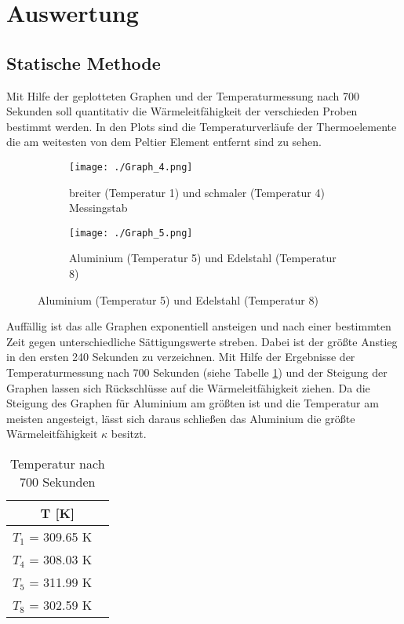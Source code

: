 \section{Auswertung}
\label{sec:Auswertung}
\subsection{Statische Methode}

Mit Hilfe der geplotteten Graphen und der Temperaturmessung nach 700 Sekunden soll quantitativ die Wärmeleitfähigkeit der verschieden Proben bestimmt werden. In den Plots sind die Temperaturverläufe der Thermoelemente die am weitesten von dem Peltier Element entfernt sind zu sehen.
\begin{figure}
	\caption{Temperaturverlauf}
	\centering
	\begin{subfigure}{0.48\textwidth}
		\centering
  		\texttt{[image: ./Graph\_4.png]}
  		\caption{breiter (Temperatur 1) und schmaler (Temperatur 4) Messingstab}
		\label{fig:T1T4}
	\end{subfigure}
	\begin{subfigure}{0.48\textwidth}
  		\centering
  		\texttt{[image: ./Graph\_5.png]}
  		\caption{Aluminium (Temperatur 5) und Edelstahl (Temperatur 8)}
		\label{fig:T5T8}
	\end{subfigure}
\end{figure}
Auffällig ist das alle Graphen exponentiell ansteigen und nach einer bestimmten Zeit gegen unterschiedliche Sättigungswerte streben. Dabei ist der größte Anstieg in den ersten 240 Sekunden zu verzeichnen. Mit Hilfe der Ergebnisse der Temperaturmessung nach 700 Sekunden (siehe Tabelle \ref{tab:kelv}) und der Steigung der Graphen lassen sich Rückschlüsse auf die Wärmeleitfähigkeit ziehen. Da die Steigung des Graphen für Aluminium am größten ist und die Temperatur am meisten angesteigt, lässt sich daraus schließen das Aluminium die größte Wärmeleitfähigkeit $\kappa$ besitzt.
\begin{table}
	\centering
	\caption{Temperatur nach 700 Sekunden}
	\label{tab:kelv}
	\begin{tabular}{c}
		\toprule
		T [K] \\
		\midrule
		$T_1$ = 309.65 K \ \\
		$T_4$ = 308.03 K \ \\
		$T_5$ = 311.99 K \ \\
		$T_8$ = 302.59 K \ \\
		\bottomrule
	\end{tabular}
\end{table}
